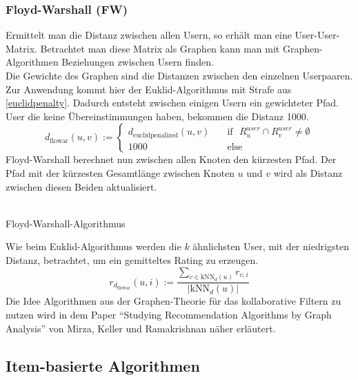 \subsubsection{Floyd-Warshall (FW)}\label{s.flowar}
Ermittelt man die Distanz zwischen allen Usern, so erhält man eine User-User-Matrix. Betrachtet man diese Matrix als Graphen kann man mit Graphen-Algorithmen Beziehungen zwischen Usern finden.\\
Die Gewichte des Graphen sind die Distanzen zwischen den einzelnen Userpaaren. Zur Anwendung kommt hier der Euklid-Algorithmus mit Strafe aus \autoref{euclidpenalty}. Dadurch entsteht zwischen einigen Usern ein gewichteter Pfad. User die keine Übereinstimmungen haben, bekommen die Distanz 1000.
	\begin{equation}
	d_{\mathrm{flowar}}(u,v) :=\left\{ \begin{array}{ll} d_{\mathrm{euclidpenalized}}(u,v) & \quad \mathrm{if}\textbf{ } R^{user}_{u}\cap R^{user}_{v} \neq \emptyset \\  1000 & \quad \mathrm{else}\end{array}\right.	\label{weights}
	\end{equation}
Floyd-Warshall berechnet nun zwischen allen Knoten den kürzesten Pfad. Der Pfad mit der kürzesten Gesamtlänge zwischen Knoten $u$ und $v$ wird als Distanz zwischen diesen Beiden aktualisiert. \\
\\
\begin{algorithm}[H]
	\mbox{Floyd-Warshall-Algorithmus}\\
\end{algorithm}
Wie beim Euklid-Algorithmus werden die $k$ ähnlichsten User, mit der niedrigsten Distanz, betrachtet, um ein gemitteltes Rating zu erzeugen.
\begin{equation}
r_{d_{\mathrm{flowar}}}(u,i) := \dfrac{\sum\limits_{v \in \mathrm{kNN}_{d}(u)} r_{v,i}}{|\mathrm{kNN}_{d}(u)|}  
\label{flowarrating}
\end{equation}
Die Idee Algorithmen aus der Graphen-Theorie für das kollaborative Filtern zu nutzen wird in dem Paper "`Studying Recommendation Algorithms by Graph Analysis"'\cite{graph} von Mirza, Keller und Ramakrishnan näher erläutert. 



\subsection{Item-basierte Algorithmen}
